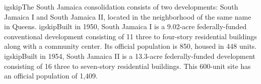  \igskipThe South Jamaica consolidation consists of two developments: South Jamaica I and South Jamaica II, located in the neighborhood of the same name in Queens. \igskipBuilt in 1950, South Jamaica I is a 9.02-acre federally-funded conventional development consisting of 11 three to four-story residential buildings along with a community center. Its official population is 850, housed in 448 units. \igskipBuilt in 1954, South Jamaica II is a 13.3-acre federally-funded development consisting of 16 three to seven-story residential buildings. This 600-unit site has an official population of 1,409.